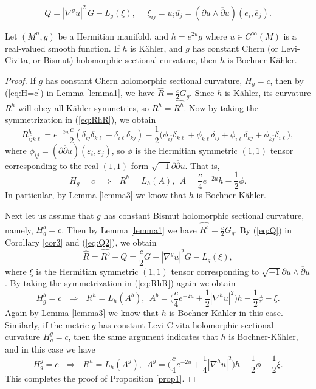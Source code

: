 \documentclass[10pt,a4paper]{amsart}
\begin{document}
\begin{equation}  \label{eq:Q2}
Q =  |\nabla^g u|^2 \,G - L_g(\xi), \ \ \ \ \ \ \xi_{i\bar{j}} = u_i \overline{u_j} =(\partial u\wedge \overline{\partial}u)(e_i,\overline{e}_j).
\end{equation}

\begin{proposition}  \label{prop1}
Let $(M^n,g)$ be a Hermitian manifold, and $h=e^{2u}g$ where $u\in C^{\infty}(M)$ is a real-valued smooth function. If $h$ is K\"ahler, and $g$ has constant Chern (or Levi-Civita, or Bismut) holomorphic sectional curvature, then $h$ is Bochner-K\"ahler.
\end{proposition}

\begin{proof}
If $g$ has constant Chern holomorphic sectional curvature, $H_g=c$, then by (\ref{eq:H=c}) in Lemma \ref{lemma1}, we have $\widehat{R}=\frac{c}{2}G_g$. Since $h$ is K\"ahler, its curvature $R^h$ will obey all K\"ahler symmetries, so $R^h=\widehat{R^h}$. Now by taking the symmetrization in (\ref{eq:RhR}),  we obtain
$$ R^h_{i\bar{j}k\bar{\ell}} = e^{-2u}\frac{c}{2}(\delta_{ij}\delta_{k\ell}+\delta_{i\ell}\delta_{kj} ) -\frac12 \big( \phi_{i\bar{j}} \delta_{k\ell} + \phi_{k\bar{\ell}} \delta_{ij} + \phi_{i\bar{\ell }} \delta_{kj} + \phi_{k\bar{j}} \delta_{i\ell} \big),  $$
where $\phi_{i\bar{j}} = (\partial \overline{\partial}u)(\varepsilon_i, \overline{\varepsilon}_j)$, so $\phi$ is the Hermitian symmetric $(1,1)$ tensor corresponding to the real $(1,1)$-form $\sqrt{-1}\partial \overline{\partial}u$. That is,
\begin{equation} \label{eq:Ac}
H_g=c \ \ \ \Longrightarrow \ \ \ R^h=L_h(A), \ \ A=\frac{c}{4}e^{-2u}h - \frac12 \phi.
\end{equation}
In particular, by Lemma \ref{lemma3} we know that $h$ is Bochner-K\"ahler.

Next let us assume that $g$ has constant Bismut holomorphic sectional curvature, namely, $H^b_g=c$. Then by Lemma \ref{lemma1} we have $\widehat{R^b}=\frac{c}{2}G_g$. By (\ref{eq:Q}) in Corollary \ref{cor3} and (\ref{eq:Q2}), we obtain
$$ \widehat{R} = \widehat{R^b} + Q = \frac{c}{2}G + |\nabla^g u|^2 G - L_g(\xi), $$
where $\xi$ is the Hermitian symmetric $(1,1)$ tensor corresponding to  $\sqrt{-1}\partial u\wedge \overline{\partial}u$. By taking the symmetrization in (\ref{eq:RhR}) again  we obtain
\begin{equation}  \label{eq:Ab}
H_g^b=c \ \ \ \Longrightarrow \ \ \ R^h=L_h(A^b), \ \ A^b=\big(\frac{c}{4}e^{-2u}+\frac12 |\nabla^hu|^2\big)h - \frac12 \phi -\xi.
\end{equation}
Again by  Lemma \ref{lemma3} we know that $h$ is Bochner-K\"ahler in this case. Similarly, if the metric $g$ has constant Levi-Civita holomorphic sectional curvature $H_g^g=c$, then the same argument indicates that $h$ is Bochner-K\"ahler, and in this case we have
\begin{equation} \label{eq:Ag}
H_g^g=c \ \ \ \Longrightarrow \ \ \ R^h=L_h(A^g), \ \ A^g=\big(\frac{c}{4}e^{-2u}+\frac14 |\nabla^hu|^2\big)h - \frac12 \phi -\frac12 \xi.
\end{equation}
This completes the proof of Proposition \ref{prop1}.
\end{proof}
\end{document}
